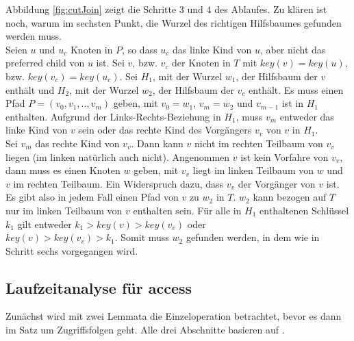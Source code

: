 \documentclass[a4paper,12pt]{article}
\begin{document}
Abbildung \ref{fig:cutJoin} zeigt die Schritte $3$ und $4$ des Ablaufes.
Zu klären ist noch, warum im sechsten Punkt, die Wurzel des richtigen Hilfsbaumes gefunden werden muss.\\ Seien $u$ und $u_c$ Knoten in $P$, so dass $u_c$ das linke Kind von $u$, aber nicht das preferred child von $u$ ist. Sei $v$, bzw. $v_c$ der Knoten in $T$ mit $\mathit{key}\left(v\right) = \mathit{key}\left(u\right)$, bzw. $\mathit{key}\left(v_c\right) = \mathit{key}\left(u_c\right)$. Sei $H_1$, mit der Wurzel $w_1$, der Hilfsbaum der $v$ enthält und $H_2$, mit der Wurzel $w_2$, der Hilfsbaum der $v_c$ enthält. Es muss einen Pfad $P = \left(v_0, v_1,.., v_m \right)$ geben, mit $v_0 = w_1$, $v_m = w_2$ und $v_{m-1}$ ist in $H_1$ enthalten. Aufgrund der Links-Rechts-Beziehung in $H_1$, muss $v_m$ entweder das linke Kind von $v$ sein oder das rechte Kind des Vorgängers $v_v$ von $v$ in $H_1$. \\
Sei $v_m$ das rechte Kind von $v_v$. Dann kann $v$ nicht im rechten Teilbaum von $v_v$ liegen (im linken natürlich auch nicht). Angenommen $v$ ist kein Vorfahre von $v_v$, dann muss es einen Knoten $w$ geben, mit $v_v$ liegt im linken Teilbaum von $w$ und $v$ im rechten Teilbaum. Ein Widerspruch dazu, dass $v_v$ der Vorgänger von $v$ ist.\\
Es gibt also in jedem Fall einen Pfad von $v$ zu $w_2$ in $T$. $w_2$ kann bezogen auf $T$ nur im linken Teilbaum von $v$ enthalten sein. Für alle in $H_1$ enthaltenen Schlüssel $k_1$ gilt entweder $k_1 > \mathit{key}\left(v\right) > \mathit{key}\left(v_v\right) $ oder \\ $ \mathit{key}\left(v\right) > \mathit{key}\left(v_v\right) > k_1 $. Somit muss $w_2$ gefunden werden, in dem wie in Schritt sechs vorgegangen wird. 


\subsection{Laufzeitanalyse für access}
Zunächst wird mit zwei Lemmata die Einzeloperation betrachtet, bevor es dann im Satz um Zugriffsfolgen geht. Alle drei Abschnitte basieren auf \cite{demainDinamicOpti}.
\end{document}
